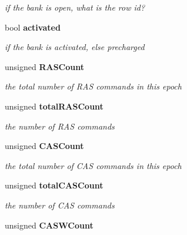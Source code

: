 \begin{DoxyCompactItemize}
\begin{DoxyCompactList}\small\item\em if the bank is open, what is the row id? \item\end{DoxyCompactList}\item 
bool {\bf activated}\label{class_d_r_a_msim_i_i_1_1_bank_a3446e366c59cb3e21c6d411a612750ba}

\begin{DoxyCompactList}\small\item\em if the bank is activated, else precharged \item\end{DoxyCompactList}\item 
unsigned {\bf RASCount}\label{class_d_r_a_msim_i_i_1_1_bank_a338a21bc0828ef57cd2d9d4aa7c0ae90}

\begin{DoxyCompactList}\small\item\em the total number of RAS commands in this epoch \item\end{DoxyCompactList}\item 
unsigned {\bf totalRASCount}\label{class_d_r_a_msim_i_i_1_1_bank_aa90b366a2a825ccf900f92f61ad212ea}

\begin{DoxyCompactList}\small\item\em the number of RAS commands \item\end{DoxyCompactList}\item 
unsigned {\bf CASCount}\label{class_d_r_a_msim_i_i_1_1_bank_a9e2f81ec167624aa605ebc364d4e1fc2}

\begin{DoxyCompactList}\small\item\em the total number of CAS commands in this epoch \item\end{DoxyCompactList}\item 
unsigned {\bf totalCASCount}\label{class_d_r_a_msim_i_i_1_1_bank_a17aa509630e5e07577b48763bb2106c3}

\begin{DoxyCompactList}\small\item\em the number of CAS commands \item\end{DoxyCompactList}\item 
unsigned {\bf CASWCount}\label{class_d_r_a_msim_i_i_1_1_bank_a55f29a529b11815fceb24a8f3649360a}


\end{DoxyCompactItemize}
